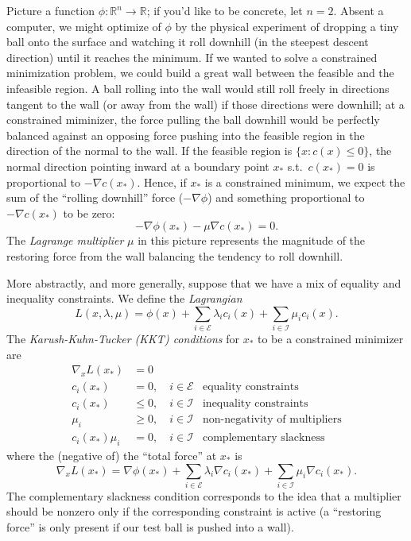 \documentclass[12pt, leqno]{article} %
\begin{document}
Picture a function \(\phi : {\mathbb{R}}^n \rightarrow {\mathbb{R}}\);
if you'd like to be concrete, let \(n = 2\). Absent a computer, we might
optimize of \(\phi\) by the physical experiment of dropping a tiny ball
onto the surface and watching it roll downhill (in the steepest descent
direction) until it reaches the minimum. If we wanted to solve a
constrained minimization problem, we could build a great wall between
the feasible and the infeasible region. A ball rolling into the wall
would still roll freely in directions tangent to the wall (or away from
the wall) if those directions were downhill; at a constrained miminizer,
the force pulling the ball downhill would be perfectly balanced against
an opposing force pushing into the feasible region in the direction of
the normal to the wall. If the feasible region is
\(\{x : c(x) \leq 0\}\), the normal direction pointing inward at a
boundary point \(x_*\) s.t.~\(c(x_*) = 0\) is proportional to
\(-\nabla c(x_*)\). Hence, if \(x_*\) is a constrained minimum, we
expect the sum of the ``rolling downhill'' force (\(-\nabla \phi\)) and
something proportional to \(-\nabla c(x_*)\) to be zero:
\[-\nabla \phi(x_*) - \mu \nabla c(x_*) = 0.\] The \emph{Lagrange
multiplier} \(\mu\) in this picture represents the magnitude of the
restoring force from the wall balancing the tendency to roll downhill.

More abstractly, and more generally, suppose that we have a mix of
equality and inequality constraints. We define the \emph{Lagrangian}
\[L(x, \lambda, \mu) = \phi(x) +
    \sum_{i \in \mathcal{E}} \lambda_i c_i(x) +
    \sum_{i \in \mathcal{I}} \mu_i c_i(x).\] The
\emph{Karush-Kuhn-Tucker (KKT) conditions} for \(x_*\) to be a
constrained minimizer are \begin{align*}
  \nabla_x L(x_*) &= 0 \\
  c_i(x_*) &= 0, \quad i \in \mathcal{E}
  & \mbox{equality constraints}\\
  c_i(x_*) & \leq 0, \quad i \in \mathcal{I}
  & \mbox{inequality constraints}\\
  \mu_i & \geq 0, \quad i \in \mathcal{I}
  & \mbox{non-negativity of multipliers}\\
  c_i(x_*) \mu_i &= 0, \quad i \in \mathcal{I}
  & \mbox{complementary slackness}
\end{align*} where the (negative of) the ``total force'' at \(x_*\) is
\[\nabla_x L(x_*) = \nabla \phi(x_*) +
    \sum_{i\in \mathcal{E}} \lambda_i \nabla c_i(x_*) +
    \sum_{i\in \mathcal{I}} \mu_i \nabla c_i(x_*).\] The complementary
slackness condition corresponds to the idea that a multiplier should be
nonzero only if the corresponding constraint is active (a ``restoring
force'' is only present if our test ball is pushed into a wall).
\end{document}

